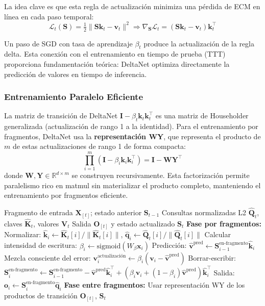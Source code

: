 La idea clave es que esta regla de actualización minimiza una pérdida de ECM en línea en cada paso temporal:
\[
\mathcal{L}_t(\mathbf{S}) = \tfrac{1}{2}\|\mathbf{S}\mathbf{k}_t - \mathbf{v}_t\|^2 \Rightarrow \nabla_{\mathbf{S}} \mathcal{L}_t = (\mathbf{S}\mathbf{k}_t - \mathbf{v}_t)\mathbf{k}_t^\top
\]

Un paso de SGD con tasa de aprendizaje $\beta_t$ produce la actualización de la regla delta. Esta conexión con el entrenamiento en tiempo de prueba (TTT) proporciona fundamentación teórica: DeltaNet optimiza directamente la predicción de valores en tiempo de inferencia.

\subsubsection{Entrenamiento Paralelo Eficiente}

La matriz de transición de DeltaNet $\mathbf{I} - \beta_t \mathbf{k}_t \mathbf{k}_t^\top$ es una matriz de Householder generalizada (actualización de rango 1 a la identidad). Para el entrenamiento por fragmentos, DeltaNet usa la \textbf{representación WY}, que representa el producto de $m$ de estas actualizaciones de rango 1 de forma compacta:
\[
\prod_{i=1}^{m} (\mathbf{I} - \beta_i \mathbf{k}_i \mathbf{k}_i^\top) = \mathbf{I} - \mathbf{W}\mathbf{Y}^\top
\]
donde $\mathbf{W}, \mathbf{Y} \in \mathbb{R}^{d \times m}$ se construyen recursivamente. Esta factorización permite paralelismo rico en matmul sin materializar el producto completo, manteniendo el entrenamiento por fragmentos eficiente.

\begin{algorithm}[H]
\caption{Actualización de Estado de DeltaNet con Representación WY}
\begin{algorithmic}[1]
\Require Fragmento de entrada $\mathbf{X}_{[t]}$; estado anterior $\mathbf{S}_{t-1}$
\Require Consultas normalizadas L2 $\hat{\mathbf{Q}}_t$, claves $\hat{\mathbf{K}}_t$, valores $\mathbf{V}_t$
\Ensure Salida $\mathbf{O}_{[t]}$ y estado actualizado $\mathbf{S}_t$
\State \textbf{Fase por fragmentos:}
    \State Normalizar: $\hat{\mathbf{k}}_i \gets \hat{\mathbf{K}}_t[i] / \|\hat{\mathbf{K}}_t[i]\|$, $\hat{\mathbf{q}}_i \gets \hat{\mathbf{Q}}_t[i] / \|\hat{\mathbf{Q}}_t[i]\|$
    \State Calcular intensidad de escritura: $\beta_i \gets \text{sigmoid}(W_\beta \mathbf{x}_i)$
    \State Predicción: $\hat{\mathbf{v}}^\text{pred} \gets \mathbf{S}_{i-1}^\text{en-fragmento} \hat{\mathbf{k}}_i$
    \State Mezcla consciente del error: $\mathbf{v}_i^\text{actualización} \gets \beta_i(\mathbf{v}_i - \hat{\mathbf{v}}^\text{pred})$
    \State Borrar-escribir: $\mathbf{S}_i^\text{en-fragmento} \gets \mathbf{S}_{i-1}^\text{en-fragmento} - \hat{\mathbf{v}}^\text{pred}\hat{\mathbf{k}}_i^\top + (\beta_i \mathbf{v}_i + (1-\beta_i)\hat{\mathbf{v}}^\text{pred})\hat{\mathbf{k}}_i^\top$
    \State Salida: $\mathbf{o}_i \gets \mathbf{S}_i^\text{en-fragmento} \hat{\mathbf{q}}_i$
\EndFor
\State \textbf{Fase entre fragmentos:} Usar representación WY de los productos de transición
\Return $\mathbf{O}_{[t]}$, $\mathbf{S}_{t}$
\end{algorithmic}
\end{algorithm}

